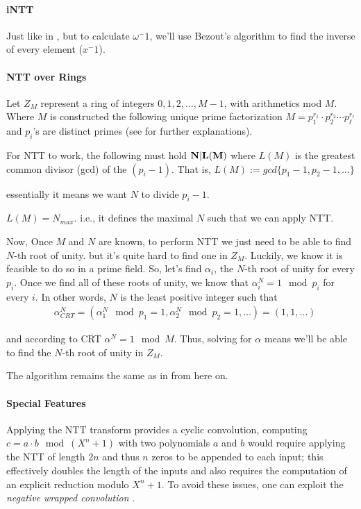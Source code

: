 \paragraph{\bf iNTT}
Just like in , but to calculate $\omega^-1$, we'll
use Bezout's algorithm to find the inverse of every element ($x^-1$).



\paragraph[short]{\bf NTT over Rings}
Let $Z_M$ represent a ring of integers ${0,1,2,\dots , M-1}$,
with arithmetics mod $M$.
Where $M$ is constructed the following unique prime factorization
$M=p_{1}^{r_1}\cdot  p_{2}^{r_2} \cdots p_{\ell}^{r_\ell}$
and $p_i$'s are distinct primes (see \cite[NTT sec. III][]{ntt}
 for further explanations).

For NTT to work, the following must hold $\bf N|L(M)$
where $L(M)$ is the greatest common
divisor (gcd) of the $(p_{i}-1)$. That is, 
$L(M):= gcd\{p_1-1,p_2-1,\dots\}$

essentially it means we want $ N$ to divide $p_i-1$.

\begin{corollary}
  $L(M)=N_{max}$. i.e., it defines the maximal $N$ 
  such that we can apply NTT.  
\end{corollary}

Now, Once $M$ and $N$ are known, to perform NTT we just need to be able to find 
$N$-th root of unity. but it's quite hard to find one in $Z_M$.
Luckily, we know it is feasible to do so in a prime field. 
So, let's find $\alpha_i$, the $N$-th root of unity for every $p_i$.
Once we find all of these roots of unity, we know that $\alpha_i^N=1 \mod p_i$ for every $i$.
In other words, $N$ is the least positive integer such that
\begin{align*}
  &\alpha_{CRT}^N = (\alpha_1^N \mod p_1=1, \alpha_2^N \mod p_2=1,\dots)= (1,1,\dots)
\end{align*}

and according to CRT $\alpha^N=1 \mod M$. Thus, solving for $\alpha$ 
means we'll be able to find the $N$-th root of unity in $Z_M$.

The algorithm remains the same as in  from here on.

\paragraph{Special Features}
Applying the NTT transform provides a cyclic convolution, computing 
$c = a \cdot b \mod (X^n + 1)$  with two polynomials $a$ and $b$ would require 
applying the NTT of length $2n$ and thus $n$ zeros to be appended to each input;
this effectively doubles the length of the inputs and also requires the computation of 
an explicit reduction modulo $X^n +1$. 
To avoid these issues, one can exploit the \emph{negative wrapped convolution} \cite{negantt}.

